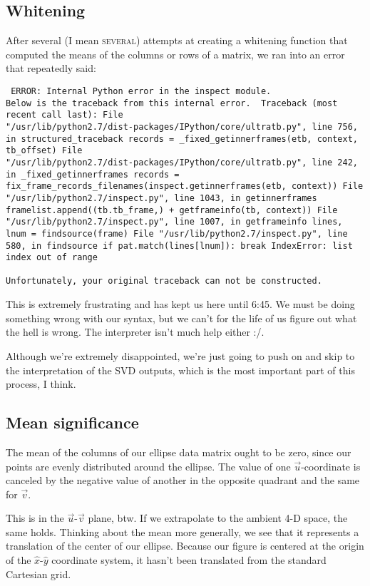 \documentclass{article} \usepackage{amsmath}
\begin{document}
\subsection{Whitening}
\label{whitening} After several (I mean \textsc{several}) attempts at
creating a whitening function that computed the means of the columns
or rows of a matrix, we ran into an error that repeatedly said:
\begin{verbatim} ERROR: Internal Python error in the inspect module.
Below is the traceback from this internal error.  Traceback (most
recent call last): File
"/usr/lib/python2.7/dist-packages/IPython/core/ultratb.py", line 756,
in structured_traceback records = _fixed_getinnerframes(etb, context,
tb_offset) File
"/usr/lib/python2.7/dist-packages/IPython/core/ultratb.py", line 242,
in _fixed_getinnerframes records =
fix_frame_records_filenames(inspect.getinnerframes(etb, context)) File
"/usr/lib/python2.7/inspect.py", line 1043, in getinnerframes
framelist.append((tb.tb_frame,) + getframeinfo(tb, context)) File
"/usr/lib/python2.7/inspect.py", line 1007, in getframeinfo lines,
lnum = findsource(frame) File "/usr/lib/python2.7/inspect.py", line
580, in findsource if pat.match(lines[lnum]): break IndexError: list
index out of range

Unfortunately, your original traceback can not be constructed.
\end{verbatim}

This is extremely frustrating and has kept us here until 6:45. We must
be doing something wrong with our syntax, but we can't for the life of
us figure out what the hell is wrong.  The interpreter isn't much help
either :/.

Although we're extremely disappointed, we're just going to push on and
skip to the interpretation of the SVD outputs, which is the most
important part of this process, I think.

\subsection{Mean significance}
\label{mean}

The mean of the columns of our ellipse data matrix ought to be zero,
since our points are evenly distributed around the ellipse.  The value
of one $\vec{u}$-coordinate is canceled by the negative value of
another in the opposite quadrant and the same for $\vec{v}$.

This is in the $\vec{u}$-$\vec{v}$ plane, btw.  If we extrapolate to
the ambient 4-D space, the same holds.  Thinking about the mean more
generally, we see that it represents a translation of the center of
our ellipse.  Because our figure is centered at the origin of the
$\hat{x}$-$\hat{y}$ coordinate system, it hasn't been translated from
the standard Cartesian grid.
\end{document}
